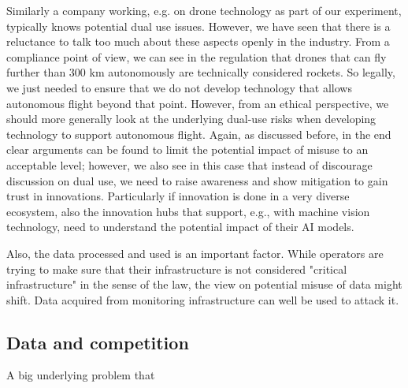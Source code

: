 Similarly a company working, e.g. on drone technology as part of our experiment, typically knows potential dual use issues. However, we have seen that there is a reluctance to talk too much about these aspects openly in the industry. From a compliance point of view, we can see in the regulation that drones that can fly further than 300 km autonomously are technically considered rockets. So legally, we just needed to ensure that we do not develop technology that allows autonomous flight beyond that point. However, from an ethical perspective, we should more generally look at the underlying dual-use risks when developing technology to support autonomous flight. Again, as discussed before, in the end clear arguments can be found to limit the potential impact of misuse to an acceptable level; however, we also see in this case that instead of discourage discussion on dual use, we need to raise awareness and show mitigation to gain trust in innovations. Particularly if innovation is done in a very diverse ecosystem, also the innovation hubs that support, e.g., with machine vision technology, need to understand the potential impact of their AI models. 

Also, the data processed and used is an important factor. While operators are trying to make sure that their infrastructure is not considered "critical infrastructure" in the sense of the law, the view on potential misuse of data might shift. Data acquired from monitoring infrastructure can well be used to attack it. 

\subsection{Data and competition}
A big underlying problem that 